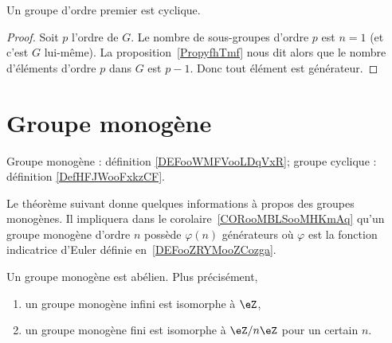 \begin{corollary}
	Un groupe d'ordre premier est cyclique.
\end{corollary}

\begin{proof}
	Soit \( p\) l'ordre de \( G\). Le nombre de sous-groupes d'ordre \( p\) est \( n=1\) (et c'est \( G\) lui-même). La proposition~\ref{PropyfhTmf} nous dit alors que le nombre d'éléments d'ordre \( p\) dans \( G\) est \( p-1\). Donc tout élément est générateur.
\end{proof}


\section{Groupe monogène}
\label{SECooXIHPooWVSjhT}

Groupe monogène : définition \ref{DEFooWMFVooLDqVxR}; groupe cyclique : définition \ref{DefHFJWooFxkzCF}.

Le théorème suivant donne quelques informations à propos des groupes monogènes. Il impliquera dans le corolaire~\ref{CORooMBLSooMHKmAq} qu'un groupe monogène d'ordre \( n\) possède \( \varphi(n)\) générateurs où \( \varphi\) est la fonction indicatrice d'Euler définie en~\ref{DEFooZRYMooZCozga}.

\begin{theorem}     \label{THOooDOMZooOEYHAe}
	Un groupe monogène est abélien. Plus précisément,
	\begin{enumerate}
		\item
		      un groupe monogène infini est isomorphe à \( \eZ\),
		\item
		      un groupe monogène fini est isomorphe à \( \eZ/n\eZ\) pour un certain \( n\).
	\end{enumerate}
\end{theorem}

